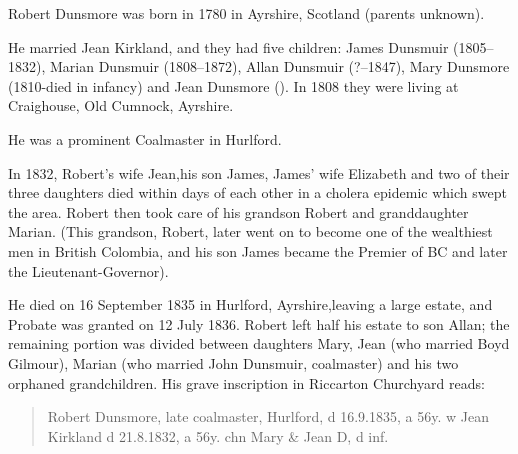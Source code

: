 
Robert Dunsmore was born in 1780 in Ayrshire, Scotland (parents unknown).  

He married Jean Kirkland, and they had five children: James Dunsmuir (1805--1832), Marian Dunsmuir (1808--1872), 
Allan Dunsmuir (?--1847), Mary Dunsmore (1810-died in infancy) and Jean Dunsmore (). In 1808 they were living at Craighouse, Old Cumnock, Ayrshire. \cite{RDunsmore1808}

He was a prominent Coalmaster in Hurlford. 

In 1832, Robert's wife Jean,his son James, James' wife Elizabeth and two of their three daughters died within days of each other in a cholera epidemic which swept the area. Robert then took care of his grandson Robert and granddaughter Marian. (This grandson, Robert, later went on to become one of the wealthiest men in British Colombia, and his son James became the Premier of BC and later the Lieutenant-Governor). 

He died on 16 September 1835 in Hurlford, Ayrshire,leaving a large estate,  and Probate was granted on 12 July 1836.\cite{RDunsmoreWill} Robert left half his estate to son Allan; the remaining portion was divided between daughters Mary, Jean (who married Boyd Gilmour), Marian (who married John Dunsmuir, coalmaster) and his two orphaned grandchildren.  His grave inscription in Riccarton Churchyard reads:

\begin{quotation}
Robert Dunsmore, late coalmaster, Hurlford, d 16.9.1835, a 56y. w Jean Kirkland d 21.8.1832, a 56y. chn Mary \& Jean D, d inf.
\end{quotation}

